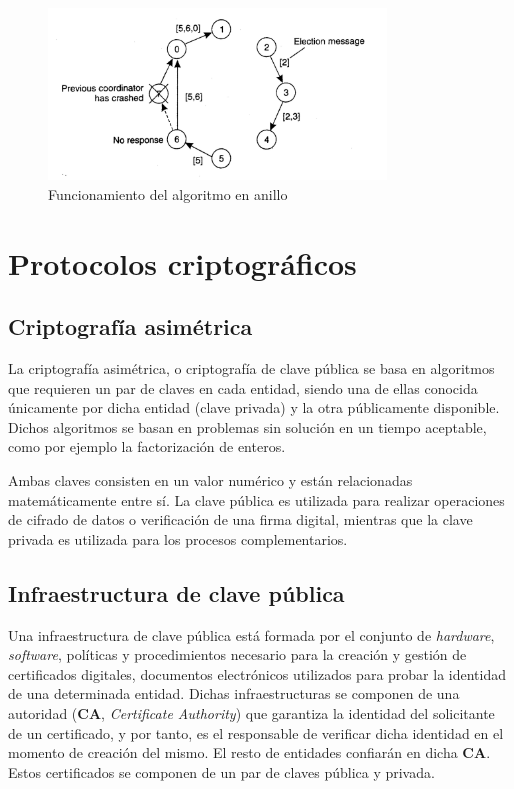 \begin{figure}[H]
  \centering
  \includegraphics[width=0.8\textwidth]{Chapter2/Figures/ringalgorithm}
  \caption{Funcionamiento del algoritmo en anillo}
  \label{fig:tanenbaum:ringalgoritm}
\end{figure} 


\section{Protocolos criptográficos}

\subsection{Criptografía asimétrica}

La criptografía asimétrica, o criptografía de clave pública se basa en algoritmos que requieren un par de claves en cada entidad, siendo una de ellas conocida únicamente por dicha entidad (clave privada) y la otra públicamente disponible. Dichos algoritmos se basan en problemas sin solución en un tiempo aceptable, como por ejemplo la factorización de enteros.

Ambas claves consisten en un valor numérico y están relacionadas matemáticamente entre sí. La clave pública es utilizada para realizar operaciones de cifrado de datos o verificación de una firma digital, mientras que la clave privada es utilizada para los procesos complementarios.

\subsection{Infraestructura de clave pública}

Una infraestructura de clave pública está formada por el conjunto de \textit{hardware}, \textit{software}, políticas y procedimientos necesario para la creación y gestión de certificados digitales, documentos electrónicos utilizados para probar la identidad de una determinada entidad. Dichas infraestructuras se componen de una autoridad (\textbf{CA}, \textit{Certificate Authority}) que garantiza la identidad del solicitante de un certificado, y por tanto, es el responsable de verificar dicha identidad en el momento de creación del mismo. El resto de entidades confiarán en dicha \textbf{CA}. Estos certificados se componen de un par de claves pública y privada\citationneeded.

